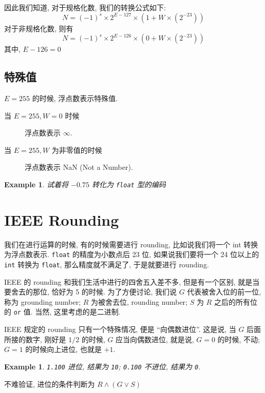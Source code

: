 \documentclass[12pt]{ctexart}
\theoremstyle{definition}
\theoremstyle{plain}
\newtheorem{exam}[definition]{Example}
\begin{document}
因此我们知道, 对于规格化数, 我们的转换公式如下: 
\begin{equation}
N = (-1) ^{s} \times 2 ^{E - 127} \times (1 + W \times (2 ^{-23} ))
\end{equation}
对于非规格化数, 则有
\begin{equation}
N = (-1) ^{s} \times 2 ^{E - 126} \times (0 + W \times (2 ^{-23}))
\end{equation}
其中, \(E - 126 = 0\)

\subsection{特殊值}
\(E = 255\) 的时候, 浮点数表示特殊值. 
\begin{description}
\item [当 \(E  = 255 ,W = 0\) 时候] 浮点数表示 \(\infty\).  
\item [当 \(E = 255, W\) 为非零值的时候] 浮点数表示 NaN (Not a Number).
\end{description}


\begin{exam}
试着将 \(-0.75\) 转化为 \verb|float| 型的编码
\end{exam}


\section{IEEE Rounding}
我们在进行运算的时候, 有的时候需要进行 rounding, 比如说我们将一个 int 转换为浮点数表示. 
\verb|float| 的精度为小数点后 23 位, 如果说我们要将一个 24 位以上的 \verb|int| 转换为 \verb|float|, 
那么精度就不满足了, 于是就要进行 rounding. 

IEEE 的 rounding 和我们生活中进行的四舍五入差不多, 但是有一个区别, 就是当要舍去的那位, 恰好为 5 的时候. 
为了方便讨论, 我们说 \(G\) 代表被舍入位的前一位, 称为 grounding number; \(R\) 为被舍去位, rounding number; \(S\) 为 \(R\) 之后的所有位的 \verb|or| 值. 当然, 这里考虑的是二进制. 

IEEE 规定的 rounding 只有一个特殊情况, 便是 ``向偶数进位''. 这是说, 当 \(G\) 后面所接的数字, 刚好是 \(1/2\) 的时候, \(G\) 应当向偶数进位, 就是说, \(G = 0\) 的时候, 不动; \(G = 1\) 的时候向上进位, 也就是 \(+1\).  

\begin{exam}
\verb|1.100| 进位, 结果为 \verb|10|; \verb|0.100| 不进位, 结果为 \verb|0|. 
\end{exam}
不难验证, 进位的条件判断为 \(R \land (G \lor S)\)
\end{document}
